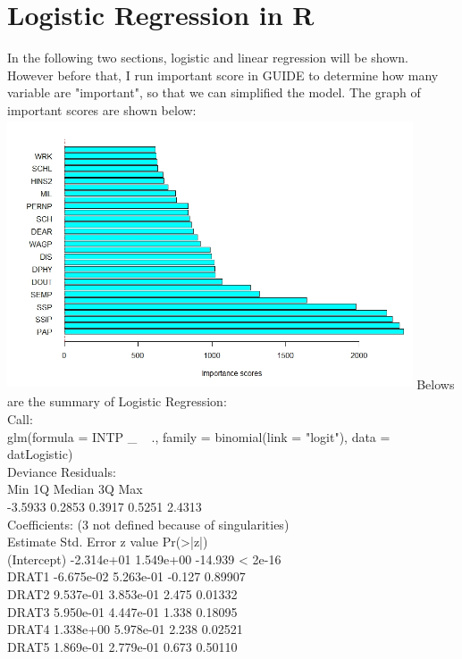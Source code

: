 \documentclass[12pt]{article}
\begin{document}
\section{Logistic Regression in R}
In the following two sections, logistic and linear regression will be shown. However before that, I run important score in GUIDE to determine how many variable are "important", so that we can simplified the model. The graph of important scores are shown below:
\newline
\includegraphics[height=8cm,width=12cm]{imp.jpeg}
\newline
Belows are the summary of Logistic Regression:\\
Call:\\
glm(formula = INTP \_  ~ ., family = binomial(link = "logit"), data = datLogistic)\\
Deviance Residuals: \\
    Min       1Q   Median       3Q      Max  \\
-3.5933   0.2853   0.3917   0.5251   2.4313  \\
Coefficients: (3 not defined because of singularities)\\
              Estimate Std. Error z value Pr(>|z|)\\
(Intercept) -2.314e+01  1.549e+00 -14.939  < 2e-16\\
DRAT1       -6.675e-02  5.263e-01  -0.127  0.89907\\
DRAT2        9.537e-01  3.853e-01   2.475  0.01332\\
DRAT3        5.950e-01  4.447e-01   1.338  0.18095\\
DRAT4        1.338e+00  5.978e-01   2.238  0.02521\\
DRAT5        1.869e-01  2.779e-01   0.673  0.50110\\
\end{document}
